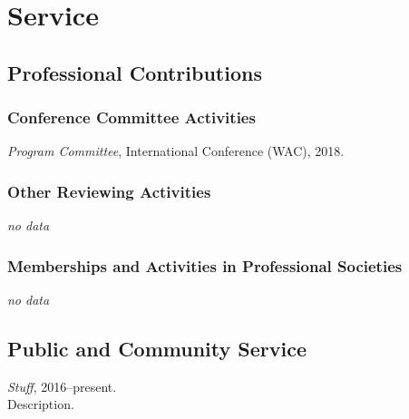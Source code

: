 
\section{Service}
\label{sec:serviceld}

    \subsection{Professional Contributions}
    \label{subsec:professional}

        \subsubsection{Conference Committee Activities}
        \label{subsubsec:mylabel4}
            \begin{subnum}
                \item  {\mark \textit{Program Committee}, International Conference (WAC), 2018.}
            \end{subnum}

        \subsubsection{Other Reviewing Activities}
            \begin{subnum}
                \item  \textsl{no data}
            \end{subnum}

        \subsubsection{Memberships and Activities in Professional Societies}
        \label{subsubsec:memberships}
            \begin{subnum}
                \item  \textsl{no data}
            \end{subnum}

    \subsection{Public and Community Service}
    \label{subsec:advisory}
        \begin{numerate}
            \item   {\mark \textit{Stuff}, 2016--present.\\
                    Description.}
        \end{numerate}

